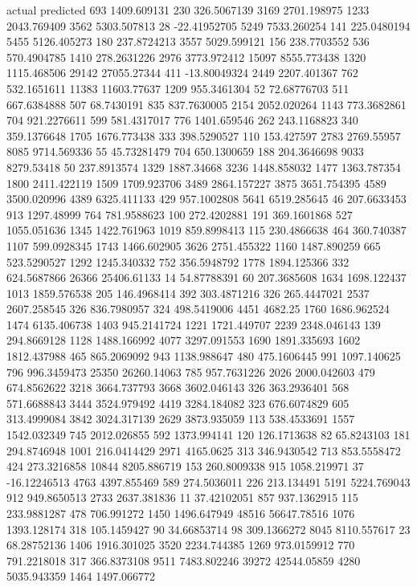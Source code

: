 actual	predicted
693	1409.609131
230	326.5067139
3169	2701.198975
1233	2043.769409
3562	5303.507813
28	-22.41952705
5249	7533.260254
141	225.0480194
5455	5126.405273
180	237.8724213
3557	5029.599121
156	238.7703552
536	570.4904785
1410	278.2631226
2976	3773.972412
15097	8555.773438
1320	1115.468506
29142	27055.27344
411	-13.80049324
2449	2207.401367
762	532.1651611
11383	11603.77637
1209	955.3461304
52	72.68776703
511	667.6384888
507	68.7430191
835	837.7630005
2154	2052.020264
1143	773.3682861
704	921.2276611
599	581.4317017
776	1401.659546
262	243.1168823
340	359.1376648
1705	1676.773438
333	398.5290527
110	153.427597
2783	2769.55957
8085	9714.569336
55	45.73281479
704	650.1300659
188	204.3646698
9033	8279.53418
50	237.8913574
1329	1887.34668
3236	1448.858032
1477	1363.787354
1800	2411.422119
1509	1709.923706
3489	2864.157227
3875	3651.754395
4589	3500.020996
4389	6325.411133
429	957.1002808
5641	6519.285645
46	207.6633453
913	1297.48999
764	781.9588623
100	272.4202881
191	369.1601868
527	1055.051636
1345	1422.761963
1019	859.8998413
115	230.4866638
464	360.740387
1107	599.0928345
1743	1466.602905
3626	2751.455322
1160	1487.890259
665	523.5290527
1292	1245.340332
752	356.5948792
1778	1894.125366
332	624.5687866
26366	25406.61133
14	54.87788391
60	207.3685608
1634	1698.122437
1013	1859.576538
205	146.4968414
392	303.4871216
326	265.4447021
2537	2607.258545
326	836.7980957
324	498.5419006
4451	4682.25
1760	1686.962524
1474	6135.406738
1403	945.2141724
1221	1721.449707
2239	2348.046143
139	294.8669128
1128	1488.166992
4077	3297.091553
1690	1891.335693
1602	1812.437988
465	865.2069092
943	1138.988647
480	475.1606445
991	1097.140625
796	996.3459473
25350	26260.14063
785	957.7631226
2026	2000.042603
479	674.8562622
3218	3664.737793
3668	3602.046143
326	363.2936401
568	571.6688843
3444	3524.979492
4419	3284.184082
323	676.6074829
605	313.4999084
3842	3024.317139
2629	3873.935059
113	538.4533691
1557	1542.032349
745	2012.026855
592	1373.994141
120	126.1713638
82	65.8243103
181	294.8746948
1001	216.0414429
2971	4165.0625
313	346.9430542
713	853.5558472
424	273.3216858
10844	8205.886719
153	260.8009338
915	1058.219971
37	-16.12246513
4763	4397.855469
589	274.5036011
226	213.134491
5191	5224.769043
912	949.8650513
2733	2637.381836
11	37.42102051
857	937.1362915
115	233.9881287
478	706.991272
1450	1496.647949
48516	56647.78516
1076	1393.128174
318	105.1459427
90	34.66853714
98	309.1366272
8045	8110.557617
23	68.28752136
1406	1916.301025
3520	2234.744385
1269	973.0159912
770	791.2218018
317	366.8373108
9511	7483.802246
39272	42544.05859
4280	5035.943359
1464	1497.066772
